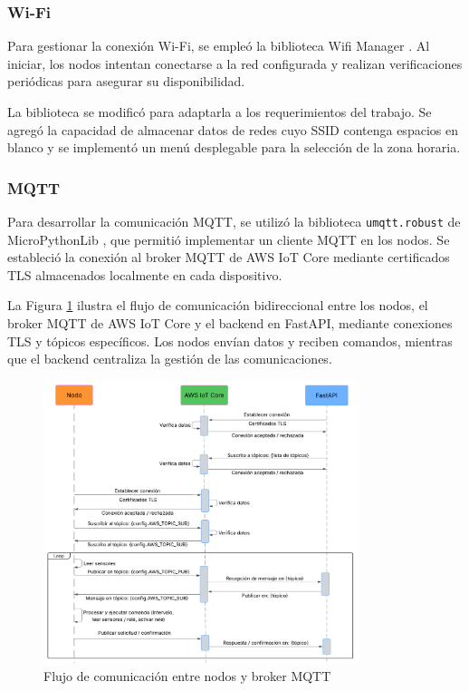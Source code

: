 \subsubsection{Wi-Fi}

Para gestionar la conexión Wi-Fi, se empleó la biblioteca Wifi Manager
\cite{MicroPythonWifiManager}. Al iniciar, los nodos intentan conectarse a la
red configurada y realizan verificaciones periódicas para asegurar su
disponibilidad.

La biblioteca se modificó para adaptarla a los requerimientos del trabajo. Se
agregó la capacidad de almacenar datos de redes cuyo SSID contenga espacios en
blanco y se implementó un menú desplegable para la selección de la zona
horaria.

\subsubsection{MQTT}

Para desarrollar la comunicación MQTT, se utilizó la biblioteca
\texttt{umqtt.robust} de MicroPythonLib \cite{MicropythonLib}, que permitió
implementar un cliente MQTT en los nodos. Se estableció la conexión al broker
MQTT de AWS IoT Core mediante certificados TLS almacenados localmente en cada
dispositivo.

La Figura \ref{fig:secuencia_mqtt} ilustra el flujo de comunicación
bidireccional entre los nodos, el broker MQTT de AWS IoT Core y el backend en
FastAPI, mediante conexiones TLS y tópicos específicos. Los nodos envían datos
y reciben comandos, mientras que el backend centraliza la gestión de las
comunicaciones.

\begin{figure}[H]
    \centering
    \includegraphics[width=0.82\textwidth]{./Images/31_secuencia_mqtt.png}
    \caption{Flujo de comunicación entre nodos y broker MQTT}
    \label{fig:secuencia_mqtt}
\end{figure}

